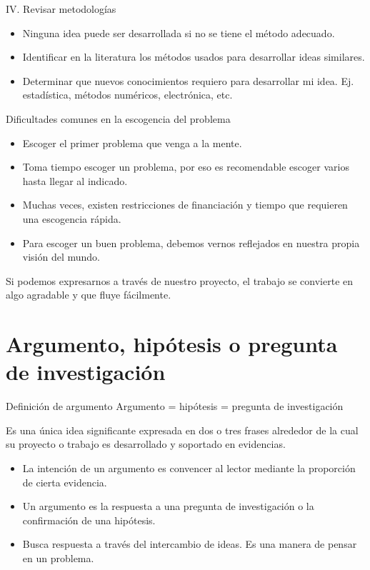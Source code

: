 \documentclass [xcolor=svgnames, t] {beamer}
\begin{document}
\begin{frame}{IV. Revisar metodolog\'ias}
\begin{itemize}
\item Ninguna idea puede ser desarrollada si no se tiene el m\'etodo adecuado. 
\item Identificar en la literatura los m\'etodos usados para desarrollar ideas similares.
\item Determinar que nuevos conocimientos requiero para desarrollar mi idea. Ej. estad\'istica, m\'etodos num\'ericos, electr\'onica, etc.
\end{itemize}
\end{frame}


\begin{frame}{Dificultades comunes en la escogencia del problema}
\begin{itemize}
\item Escoger el primer problema que venga a la mente.
\item Toma tiempo escoger un problema, por eso es recomendable escoger varios hasta llegar al indicado.
\item Muchas veces, existen restricciones de financiaci\'on y tiempo que requieren una escogencia r\'apida.
\item Para escoger un buen problema, debemos vernos reflejados en nuestra propia visi\'on del mundo. 
\end{itemize}
\centering
\alert{Si podemos expresarnos a trav\'es de nuestro proyecto, el trabajo se convierte en algo agradable y que fluye fácilmente.}
\end{frame}

\section{Argumento, hip\'otesis o pregunta de investigaci\'on}
\begin{frame}{Definici\'on de argumento}
Argumento = hip\'otesis = pregunta de investigaci\'on
\begin{exampleblock}{}
Es una \'unica idea significante expresada en dos o tres frases alrededor de la cual su proyecto o trabajo es desarrollado y soportado en evidencias.
\end{exampleblock}
\begin{itemize}
\item La intenci\'on de un argumento es convencer al lector mediante la proporci\'on de cierta evidencia.
\item Un argumento es la respuesta a una pregunta de investigaci\'on o la confirmaci\'on de una hip\'otesis.
\item Busca respuesta a trav\'es del intercambio de ideas. Es una manera de pensar en un problema. 
\end{itemize}
\end{frame}
\end{document}
